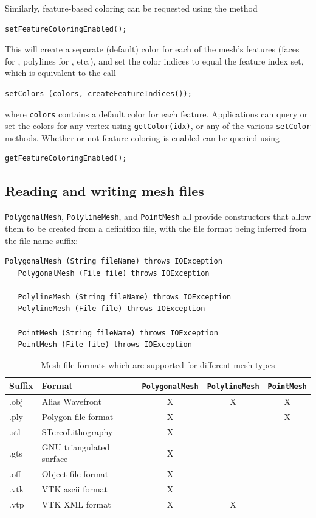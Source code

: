 Similarly, feature-based coloring can be requested using the method
%
\begin{lstlisting}[]
   setFeatureColoringEnabled();
\end{lstlisting}
%
This will create a separate (default) color for each of the mesh's
features (faces for 
, polylines for
, etc.),
and set the color indices to equal the feature 
index set, which is equivalent to the call
%
\begin{lstlisting}[]
   setColors (colors, createFeatureIndices());
\end{lstlisting}
%
where {\tt colors} contains a default color for each feature.
Applications can query or set the colors
for any vertex using {\tt getColor(idx)}, or any of the
various {\tt setColor} methods. Whether or not feature coloring
is enabled can be queried using
%
\begin{lstlisting}[]
   getFeatureColoringEnabled();
\end{lstlisting}
%

\subsection{Reading and writing mesh files}
\label{MeshFileIO:sec}

{\tt PolygonalMesh}, {\tt PolylineMesh}, and {\tt PointMesh} all
provide constructors that allow them to be created from a definition
file, with the file format being inferred from the file name
suffix:
%
\begin{lstlisting}[]
   PolygonalMesh (String fileName) throws IOException
   PolygonalMesh (File file) throws IOException

   PolylineMesh (String fileName) throws IOException
   PolylineMesh (File file) throws IOException

   PointMesh (String fileName) throws IOException
   PointMesh (File file) throws IOException
\end{lstlisting}
%
\begin{table}[h]
\centering
\begin{tabular}{|ll|ccc|}
\hline
Suffix & Format & {\tt PolygonalMesh} & {\tt PolylineMesh} & {\tt PointMesh} \\
\hline
.obj & Alias Wavefront &X&X&X\\
.ply & Polygon file format &X&&X\\
.stl & STereoLithography &X&&\\
.gts & GNU triangulated surface &X&&\\
.off & Object file format &X&&\\
.vtk & VTK ascii format &X&&\\
.vtp & VTK XML format &X&X&\\
\hline
\end{tabular}
\caption{Mesh file formats which are supported for different mesh types}
\label{meshFormatSupport:tbl}
\end{table}

